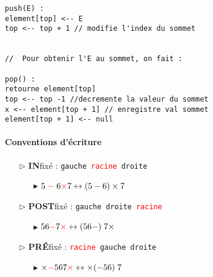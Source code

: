 \documentclass{report}
\begin{document}
\begin{multicols*}{3}
\begin{lstlisting}
push(E) :
element[top] <-- E
top <-- top + 1 // modifie l'index du sommet 


//  Pour obtenir l'E au sommet, on fait : 

pop() :
retourne element[top] 
top <-- top -1 //decremente la valeur du sommet
x <-- element[top + 1] // enregistre val sommet  
element[top + 1] <-- null
    \end{lstlisting}


    \paragraph{Conventions d'écriture}

    \begin{itemize}
      \item [$\rhd$ ] \textbf{IN}fixé : \texttt{gauche \textcolor{red}{racine} droite}   
        \begin{itemize}
          \item [$\blacktriangleright$ ] 
            $5 \; \textcolor{red}{ - } \;   6 \textcolor{red}{\times} 7
            \leftrightarrow (5 - 6) \times 7 $  
        \end{itemize}
      \item [$\rhd$ ] \textbf{POST}fixé : 
        \texttt{gauche droite \textcolor{red}{racine}}   
        \begin{itemize}
          \item [$\blacktriangleright$ ] 
            $56 \textcolor{red}{ - }   7 \textcolor{red}{\times} 
            \leftrightarrow (56-) \; 7\times$  
        \end{itemize}
      \item [$\rhd$ ] \textbf{PRÉ}fixé : \texttt{\textcolor{red}{racine} gauche droite}  
        \begin{itemize}
          \item [$\blacktriangleright$ ] 
            $\times \textcolor{red}{ - }567 \textcolor{red}{\times} 
            \leftrightarrow \times (-56) \; 7$  
        \end{itemize}
    \end{itemize}













    \end{multicols*}
\end{document}

